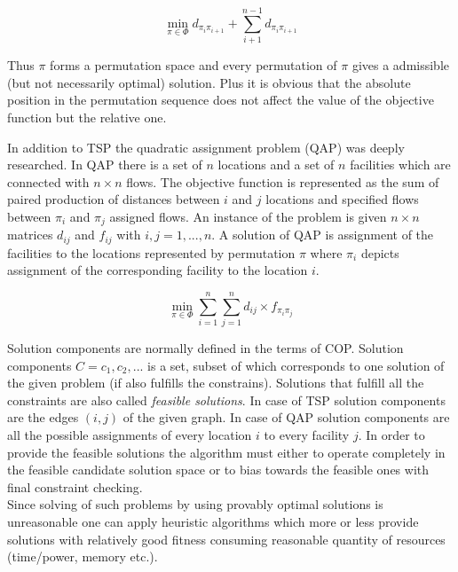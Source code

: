 \begin{equation}
\min \limits_{\pi \in \Phi} {d_{\pi_i \pi_{i+1}}} + \sum \limits_{i+1}^{n-1} {d_{\pi_i \pi_{i+1}}}
\end{equation}

Thus $\pi$ forms a permutation space and every permutation of $\pi$ gives a admissible (but not necessarily optimal) solution. Plus it is obvious that the absolute position in the permutation sequence does not affect the value of the objective function but the relative one.

In addition to TSP the quadratic assignment problem (QAP) was deeply researched. In QAP there is a set of $n$ locations and a set of $n$ facilities which are connected with $n \times n$ flows. The objective function is represented as the sum of paired production of distances between $i$ and $j$ locations and specified flows between $\pi_i$ and $\pi_j$ assigned flows. An instance of the problem is given $n \times n$ matrices $d_{ij}$ and $f_{ij}$ with $i, j = 1,...,n$. A solution of QAP is assignment of the facilities to the locations represented by permutation $\pi$ where $\pi_i$ depicts assignment of the corresponding facility to the location $i$.

\begin{equation}
\min \limits_{\pi \in \Phi} \sum \limits_{i=1}^n \sum \limits_{j=1}^n {d_{ij} \times f_{\pi_i \pi_j}}
\end{equation}

Solution components are normally defined in the terms of COP. Solution components $C={c_1,c_2,...}$ is a set, subset of which corresponds to one solution of the given problem (if also fulfills the constrains). Solutions that fulfill all the constraints are also called \emph{feasible solutions}. In case of TSP solution components are the edges $(i,j)$ of the given graph. In case of QAP solution components are all the possible assignments of every location $i$ to every facility $j$. In order to provide the feasible solutions the algorithm must either to operate completely in the feasible candidate solution space or to bias towards the feasible ones with final constraint checking. \\

Since solving of such problems by using provably optimal solutions is unreasonable one can apply heuristic algorithms which more or less provide solutions with relatively good fitness consuming reasonable quantity of resources (time/power, memory etc.). \\

